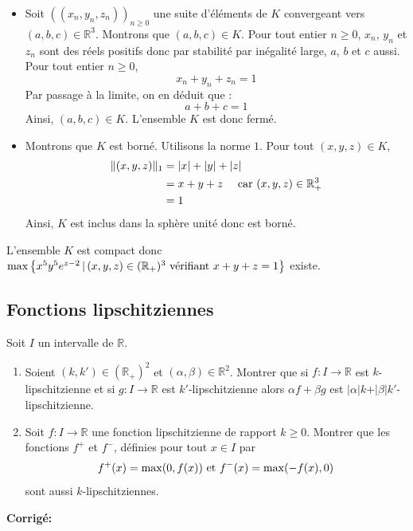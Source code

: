 \documentclass[a4paper,twoside,french,11pt]{VcCours}
\newcommand{\corr}{\textbf{Corrigé:}}
\begin{document}
\begin{itemize}
\item Soit $((x_n,y_n,z_n))_{n \geq 0}$ une suite d'éléments de $K$ convergeant vers $(a,b,c) \in \mathbb{R}^3$. Montrons que $(a,b,c) \in K$. Pour tout entier $n \geq 0$, $x_n$, $y_n$ et $z_n$ sont des réels positifs donc par stabilité par inégalité large, $a$, $b$ et $c$ aussi. Pour tout entier $n \geq 0$,
$$ x_n + y_n + z_n = 1$$
Par passage à la limite, on en déduit que :
$$ a+b+c=1$$
Ainsi, $(a,b,c) \in K$. L'ensemble $K$ est donc fermé.
\item Montrons que $K$ est borné. Utilisons la norme $1$. Pour tout $(x,y,z) \in K$,
\begin{align*}
\Vert (x,y,z) \Vert_1 & = \vert x \vert + \vert y \vert + \vert z \vert \\
& = x+y+z \quad \hbox{ car } (x,y,z) \in \mathbb{R}_+^{3} \\
& = 1
\end{align*}
Ainsi, $K$ est inclus dans la sphère unité donc est borné.
\end{itemize}
L'ensemble $K$ est compact donc $\max \left\lbrace x^5y^5 e^{z-2} \, \vert \, (x,y,z) \in (\mathbb{R}_+)^3 \hbox{ vérifiant } x+y+z =1 \right\rbrace$ existe.


\subsection{Fonctions lipschitziennes}



\begin{Exercice}{} Soit $I$ un intervalle de $\mathbb{R}$.

\begin{enumerate}
\item Soient $(k,k') \in (\mathbb{R}_+)^2$ et $(\alpha, \beta) \in \mathbb{R}^2$. Montrer que si $f : I \rightarrow \mathbb{R}$ est $k$-lipschitzienne et si $g : I \rightarrow \mathbb{R}$ est $k'$-lipschitzienne alors $\alpha f+ \beta g$ est $\vert \alpha \vert k  + \vert \beta \vert k'$-lipschitzienne.
\item Soit $f : I \rightarrow \mathbb{R}$ une fonction lipschitzienne de rapport $k \geq 0$. Montrer que les fonctions $f^+$ et $f^{-}$, définies pour tout $x \in I$ par 
$$ f^+(x)= \max(0,f(x)) \hbox{ et } f^{-}(x) = \max(-f(x),0) $$
sont aussi $k$-lipschitziennes.
\end{enumerate}
\end{Exercice}

\corr 
\end{document}
